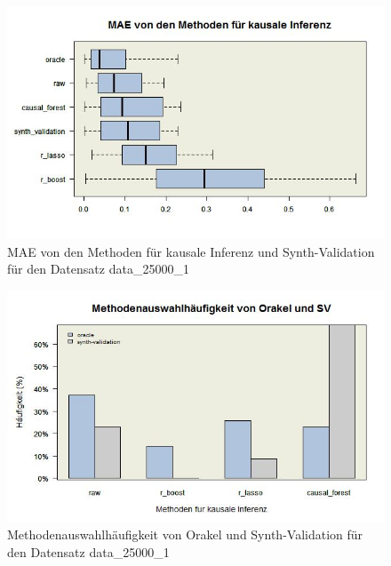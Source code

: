 \documentclass[12pt,a4paper,twoside]{scrartcl}
\numberwithin{equation}{section}
\newcounter{mypagecount}%
\newenvironment{interlude}{%
  \clearpage
  \setcounter{mypagecount}{\value{page}}%
  \thispagestyle{empty}%
  \pagestyle{empty}%
}{%
  \clearpage
  \setcounter{page}{\value{mypagecount}}%
}
\begin{document}
\begin{interlude}
\begin{appendices}
\begin{center}
\begin{figure}[H]
    \centering
    \includegraphics[height=0.5\textwidth, width=1\textwidth]{figures/plots/appendix/rawData25000aBoxplot.jpeg}
    \caption[MAE von den Methoden für kausale Inferenz und Synth-Validation für den Datensatz data\_25000\_1]{MAE von den Methoden für kausale Inferenz und Synth-Validation für den Datensatz data\_25000\_1}
  \end{figure}
\end{center}

\begin{center}
\begin{figure}[H]
    \centering
    \includegraphics[height=0.5\textwidth, width=1\textwidth]{figures/plots/appendix/rawData25000aBarplot.jpeg}
    \caption[Methodenauswahlhäufigkeit von Orakel und Synth-Validation für den Datensatz data\_25000\_1]{Methodenauswahlhäufigkeit von Orakel und Synth-Validation für den Datensatz data\_25000\_1}
  \end{figure}
\end{center}


\end{appendices}
\end{interlude}
\end{document}
